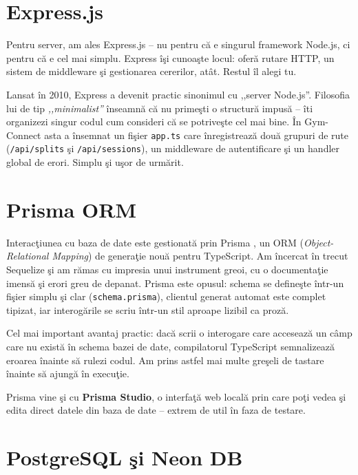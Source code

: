 \section{Express.js}

Pentru server, am ales Express.js \cite{express2024} -- nu pentru
c\u a e singurul framework Node.js, ci pentru c\u a e cel mai
simplu. Express \^ i\c si cunoa\c ste locul: ofer\u a rutare HTTP,
un sistem de middleware \c si gestionarea cererilor, at\^ at.
Restul \^ il alegi tu.

Lansat \^ in 2010, Express a devenit practic sinonimul cu
,,server Node.js''. Filosofia lui de tip \textit{,,minimalist''}
\^ inseamn\u a c\u a nu prime\c sti o structur\u a impus\u a --
\^ iti organizezi singur codul cum consideri c\u a se potrive\c ste
cel mai bine. \^ In Gym-Connect asta a \^ insemnat un fi\c sier
\texttt{app.ts} care \^ inregistreaz\u a dou\u a grupuri de rute
(\texttt{/api/splits} \c si \texttt{/api/sessions}), un
middleware de autentificare \c si un handler global de erori.
Simplu \c si u\c sor de urm\u arit.

\section{Prisma ORM}

Interac\c tiunea cu baza de date este gestionat\u a prin Prisma
\cite{prisma2024}, un ORM (\textit{Object-Relational Mapping})
de genera\c tie nou\u a pentru TypeScript. Am \^ incercat \^ in
trecut Sequelize \c si am r\u amas cu impresia unui instrument
greoi, cu o documenta\c tie imens\u a \c si erori greu de depanat.
Prisma este opusul: schema se define\c ste \^ intr-un fi\c sier
simplu \c si clar (\texttt{schema.prisma}), clientul generat
automat este complet tipizat, iar interog\u arile se scriu
\^ intr-un stil aproape lizibil ca proz\u a.

Cel mai important avantaj practic: dac\u a scrii o interogare
care acceseaz\u a un c\^ amp care nu exist\u a \^ in schema bazei
de date, compilatorul TypeScript semnalizeaz\u a eroarea
\^ inainte s\u a rulezi codul. Am prins astfel mai multe gre\c seli
de tastare \^ inainte s\u a ajung\u a \^ in execu\c tie.

Prisma vine \c si cu \textbf{Prisma Studio}, o interfa\c t\u a
web local\u a prin care po\c ti vedea \c si edita direct datele
din baza de date -- extrem de util \^ in faza de testare.

\section{PostgreSQL \c si Neon DB}

